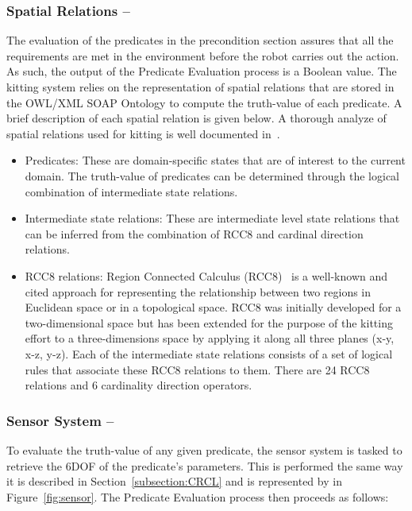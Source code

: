 \subsubsection{Spatial Relations -- }
 The evaluation of the predicates in the precondition section assures that all the requirements are met in the environment before the robot carries out the action. As such, the output of the \textsf{Predicate Evaluation} process is a Boolean value. The kitting system relies on the representation of spatial relations that are stored in the \textsf{OWL/XML SOAP Ontology} to compute the truth-value of each predicate. A brief description of each spatial relation is given below. A thorough analyze of spatial relations used for kitting is well documented in~\cite{SCHLENOFF.RAS.2013}. 
\begin{itemize}
 \item Predicates: These are domain-specific states that are of interest to the current domain. The truth-value of predicates can be determined through the logical combination of intermediate state relations.
\item Intermediate state relations: These are intermediate level state relations that can be inferred from the combination of RCC8 and cardinal direction relations.
\item RCC8 relations: Region Connected Calculus (RCC8)~\cite{Wolter2000} is a well-known and cited approach for representing the relationship between two regions in Euclidean space or in a topological space. RCC8 was initially developed for a two-dimensional space but has been extended for the purpose of the kitting effort to a three-dimensions space by applying it along all three planes (x-y, x-z, y-z). Each of the intermediate state relations consists of a set of logical rules that associate these RCC8 relations to them. There are 24 RCC8 relations and 6 cardinality direction operators.
\end{itemize}

\subsubsection{Sensor System -- }
To evaluate the truth-value of any given predicate, the sensor system is tasked to retrieve the 6DOF of the predicate's parameters. This is performed the same way it is described in Section~\ref{subsection:CRCL} and is represented by  in Figure~\ref{fig:sensor}. The \textsf{Predicate Evaluation} process then proceeds as follows:

